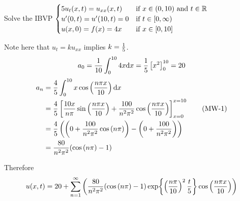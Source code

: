 Solve the IBVP $
\begin{cases}
    5u_t(x,t) = u_{xx}(x,t) & \text{if } x \in (0, 10) \text{ and } t \in \mathbb{R}\\
    u'(0,t) = u'(10,t) = 0 & \text{if } t \in [0,\infty)\\
    u(x, 0) = f(x) = 4x& \text{if } x \in [0,10]
\end{cases} $

Note here that $u_t = ku_{xx}$ implies $k=\over{5}$.
$$   a_0 = \over{10}\int_0^{10} 4x \dd x = \frac{1}{5} \brac{x^2}_{0}^{10} = 20 $$
\begin{align*}
    a_n &= \frac{4}{5} \int_0^{10} x  \cosp{\npxo{10}}\dd x\\
    &= \frac{4}{5}
        \brac{ \frac{10x}{n \pi} \sinp{\npxo{10}} + \frac{100}{n^2 \pi^2} \cosp{\npxo{10}}}_{x=0}^{x=10}
        \tag{MW-1} \\
    &= \frac{4}{5} \pars{
        \pars{
            0 + \frac{100}{n^2 \pi^2} \cosp{\np}
        } - \pars{
            0 + \frac{100}{n^2 \pi^2}
        }
    }\\
    &= \frac{80}{n^2 \pi^2} (\cosp{\np} - 1)
\end{align*}

Therefore 
$$u(x,t) = 20 + \sumn{1} \pars{
    \frac{80}{n^2 \pi^2} (\cosp{\np} - 1) 
    \exp{\pfrac{\np}{10}^2 \frac{t}{5} } \cosp{\npxo{10}}
}$$